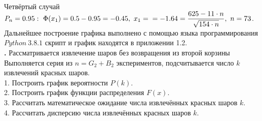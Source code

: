\documentclass{article}
\begin{document}
\vspace{\baselineskip}
\\
Четвёртый случай \begin{math}
P_n = 0.95:  \ \Phi(x_1) = 0.5 - 0.95 = -0.45, \ x_1 = \\ = -1.64 = \displaystyle\frac{625 - 11\cdot n}{\sqrt{154 \cdot n}}, \ n = 73 \end{math}.
\vspace{\baselineskip}
\\
Дальнейшее построение графика выполнено с помощью языка программирования \begin{math}
 Python \ 3.8.1
\end{math} скрипт и график находятся в приложении 1.2.
\vspace{\baselineskip}\vspace{\baselineskip}\vspace{\baselineskip}\vspace{\baselineskip}\vspace{\baselineskip}\vspace{\baselineskip}\vspace{\baselineskip}\vspace{\baselineskip}
\\
\textbf {.} 
\large Рассматривается извлечение шаров без возвращения из второй корзины  Выполняется серия из \begin{math}n=G_2+B_2\end{math} экспериментов, подсчитывается число \begin{math}k\end{math} извлечений красных шаров.
\vspace{\baselineskip}
\\
\large 1. Построить график вероятности \begin{math}P(k)\end{math}.
\vspace{\baselineskip}
\\
\large 2. Построить график функции распределения \begin{math}F(x)\end{math}.
\vspace{\baselineskip}
\\
\large 3. Рассчитать математическое ожидание числа извлечённых красных шаров \begin{math}k\end{math}.
\vspace{\baselineskip}
\\
\large 4. Рассчитать дисперсию числа извлечённых красных шаров \begin{math}k\end{math}.
\end{document}

